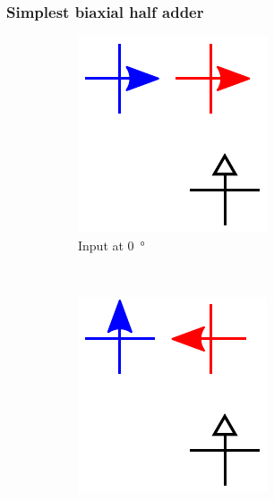 \documentclass[11pt,a4paper,english]{article}
\newcommand{\rulesep}{\unskip\ \vrule\ }
\begin{document}
\subsubsection{Simplest biaxial half adder}
\begin{figure}
\centering
\begin{subfigure}[t]{0.23\textwidth}
    \includegraphics[width=\textwidth]{Figures/half_adder/schematic/000006_inputs/Input 0 deg.pdf}
    \caption{Input at \SI{0}{\degree}}
\end{subfigure}
\rulesep
\begin{subfigure}[t]{0.23\textwidth}
    \includegraphics[width=\textwidth]{Figures/half_adder/schematic/000006_inputs/Input 90 deg.pdf}

\end{subfigure}
\end{figure}
\end{document}
